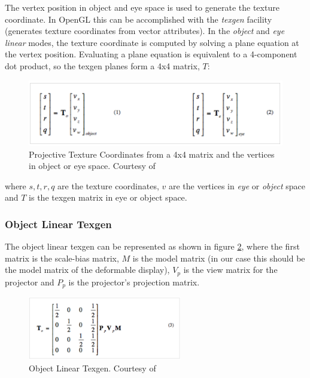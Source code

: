 \documentclass[]{article}
\begin{document}
The vertex position in object and eye space is used to generate the texture coordinate. In OpenGL this can be accomplished with the \textit{texgen} facility (generates texture coordinates from vector attributes). In the \textit{object} and \textit{eye linear} modes, the texture coordinate is computed by solving a plane equation at the vertex position. Evaluating a plane equation is equivalent to a 4-component dot product, so the texgen planes form a 4x4 matrix, $T$:

\begin{figure}[hbtp]
    \centering
    \includegraphics[width=1.0\textwidth]{figures/PTMCoordinates.PNG}
    \caption{Projective Texture Coordinates from a 4x4 matrix and the vertices in object or eye space. Courtesy of \cite{cassNvidia}}
    \label{fig:ProjectiveTextureMapping}
\end{figure}

where $s, t, r, q$ are the texture coordinates, $v$ are the vertices in \textit{eye} or \textit{object} space and $T$ is the texgen matrix in eye or object space.

\subsubsection{Object Linear Texgen}

The object linear texgen can be represented as shown in figure \ref{fig:ObjectLinearTexgen}, where the first matrix is the scale-bias matrix, $M$ is the model matrix (in our case this should be the model matrix of the deformable display), $V_{p}$ is the view matrix for the projector and $P_{p}$ is the projector's projection matrix.

\begin{figure}[hbtp]
    \centering
    \includegraphics[width=0.6\textwidth]{figures/ObjectLinearTexgen.PNG}
    \caption{Object Linear Texgen. Courtesy of \cite{cassNvidia}}
    \label{fig:ObjectLinearTexgen}
\end{figure}
\end{document}
